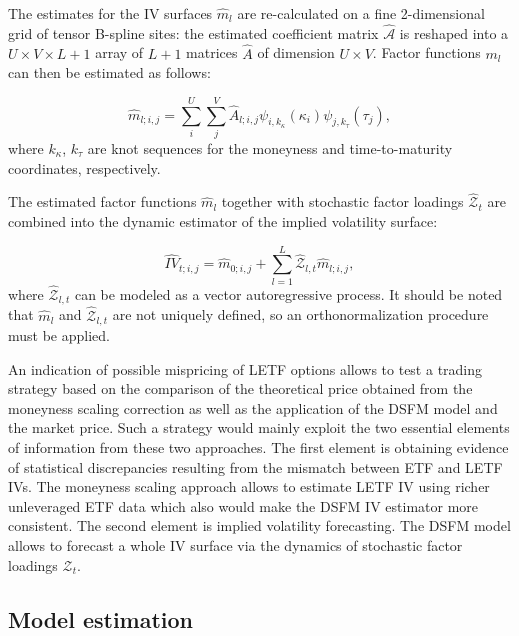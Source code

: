 \documentclass{rQUF2e}
\theoremstyle{plain}
\theoremstyle{definition}
\begin{document}
	The estimates for the IV surfaces $\widehat{m}_l$ are re-calculated on a fine 2-dimensional grid of tensor B-spline sites: the estimated coefficient matrix $\widehat{\mathcal{A}}$ is reshaped into a $U \times V \times L+1$ array of $L+1$ matrices $\widehat{A}$ of dimension $U \times V$. Factor functions $m_l$ can then be estimated as follows:
	
	\begin{equation}
	\widehat{m}_{l;i,j} = \sum_{i}^{U} \sum_{j}^{V} \widehat{A}_{l;i,j} \psi_{i,k_{\kappa}} (\kappa_i) \psi_{j,k_{\tau}} (\tau_j),
	\label{facfun}
	\end{equation}
	where $k_{\kappa}$, $k_{\tau}$ are knot sequences for the moneyness and time-to-maturity coordinates, respectively. 
	
	The estimated factor functions $\widehat{m}_{l}$ together with stochastic factor loadings $\widehat{\mathcal{Z}}_t$ are combined into the dynamic estimator of the implied volatility surface:
	
	\begin{equation}
	\widehat{IV}_{t;i,j} = \widehat{m}_{0;i,j} + \sum_{l=1}^{L} \widehat{\mathcal{Z}}_{l,t} \widehat{m}_{l;i,j},
	\label{dynivest}
	\end{equation}
	where $\widehat{\mathcal{Z}}_{l,t}$ can be modeled as a vector autoregressive process. It should be noted that $\widehat{m}_{l}$ and $\widehat{\mathcal{Z}}_{l,t}$ are not uniquely defined, so an orthonormalization procedure must be applied.
	
	An indication of possible mispricing of LETF options allows to test a trading strategy based on the comparison of the theoretical price obtained from the moneyness scaling correction as well as the application of the DSFM model and the market price. Such a strategy would mainly exploit the two essential elements of information from these two approaches. The first element is obtaining evidence of statistical discrepancies resulting from the mismatch between ETF and LETF IVs. The moneyness scaling approach allows to estimate LETF IV using richer unleveraged ETF data which also would make the DSFM IV estimator more consistent. The second element is implied volatility forecasting. The DSFM model allows to forecast a whole IV surface via the dynamics of stochastic factor loadings $\mathcal{Z}_t$. 
	
	
	\subsection{Model estimation}
	
\end{document}
